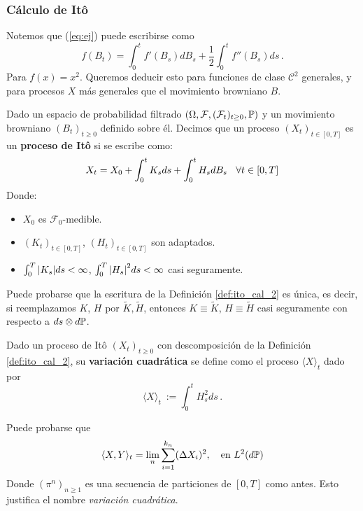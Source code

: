 \subsubsection{Cálculo de It\^{o}}

Notemos que (\ref{eq:ej}) puede escribirse como
\begin{equation*}
    \label{eq:ito_cal_1}
    f(B_t) = \int_{0}^t f'(B_s) dB_s + \frac{1}{2} \int_{0}^{t} f''(B_s) ds\,.
\end{equation*}
Para $f(x) = x^2$. Queremos deducir esto para funciones de clase $\mathcal{C}^2$ generales, y para procesos $X$ más generales que el movimiento browniano $B$. 
\begin{definition}[Proceso de It\^{o}]
\label{def:ito_cal_2}
Dado un espacio de probabilidad filtrado $(\Omega, \mathcal{F}, (\mathcal{F}_t)_{t \geq 0}, \P)$ y 
un movimiento browniano $(B_t)_{t \ge 0}$ definido sobre él. Decimos
que un proceso $(X_t)_{t \in [0,T]}$ es un \textbf{proceso de It\^{o}} si se escribe como:
\begin{equation*}
    \label{eq:ito_cal_2}
    X_t = X_0 + \int_{0}^{t} K_s ds + \int_{0}^{t} H_s dB_s \espacio \forall t \in [0,T]
\end{equation*}
Donde:
\begin{itemize}
    \item $X_0$ es $\mathcal{F}_0$-medible. 
    \item $(K_t)_{t \in [0,T]}$, $(H_t)_{t \in [0,T]}$ son adaptados. 
    \item $\int_{0}^{T} \abs{K_s} ds < \infty$, $\int_{0}^{T} \abs{H_s}^2 ds < \infty$ casi seguramente.
\end{itemize}
\end{definition}

\begin{remark}
    Puede probarse que la escritura de la Definición \ref{def:ito_cal_2} es única, es decir, si reemplazamos $K$, $H$ por  $\tilde{K}, \tilde{H}$, entonces $K \equiv \tilde{K}$, $H \equiv \tilde{H}$ casi seguramente con respecto a $ds \otimes d\P$. 
\end{remark}

\begin{definition}
Dado un proceso de It\^{o} $(X_t)_{t \ge 0}$ con descomposición de la Definición \ref{def:ito_cal_2}, su \textbf{variación cuadrática} se define como el proceso $\langle X \rangle_t$ dado por
\begin{equation*}
        \langle X \rangle_t ~ := \int_{0}^{t} H^2_s ds \,.
\end{equation*}
\end{definition}
\begin{remark}
    Puede probarse que 
    \begin{equation*}
        \langle X,Y \rangle_t = \lim_{n} \sum_{i=1}^{k_n} (\Delta X_i)^2, ~ ~ \text{ en } L^2({d\P})
    \end{equation*}
    Donde $(\pi^{n})_{n \ge 1}$ es una secuencia de particiones de $[0,T]$ como antes. Esto justifica el nombre \textit{variación cuadrática}.
\end{remark}

